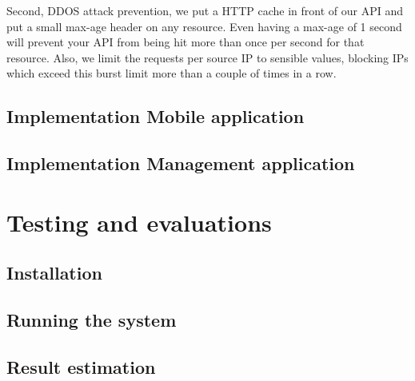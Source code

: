 		\indent Second, DDOS attack prevention, we put a HTTP cache in front of our API and put a small max-age header on any resource. Even having a max-age of 1 second will prevent your API from being hit more than once per second for that resource. Also, we limit the requests per source IP to sensible values, blocking IPs which exceed this burst limit more than a couple of times in a row.
\subsection{Implementation Mobile application}
\subsection{Implementation Management application}


\section{Testing and evaluations}
\subsection{Installation}
\subsection{Running the system}
\subsection{Result estimation}


